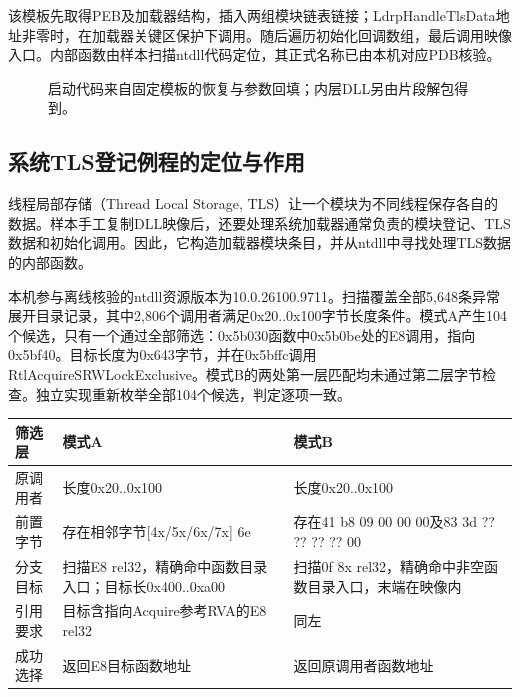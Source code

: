 \documentclass[UTF8,a4paper,zihao=5,fontset=windows]{ctexart}
\newcommand{\code}[1]{{\ttfamily\small #1}}
\newcommand{\fstep}[2]{\textbf{#1}\\[-1pt]{\footnotesize #2}}
\begin{document}
该模板先取得PEB及加载器结构，插入两组模块链表链接；\code{LdrpHandleTlsData}地址非零时，在加载器关键区保护下调用。随后遍历初始化回调数组，最后调用映像入口。内部函数由样本扫描ntdll代码定位，其正式名称已由本机对应PDB核验。

\begin{figure}[H]\centering
{}
\caption{启动代码来自固定模板的恢复与参数回填；内层DLL另由片段解包得到。}
\end{figure}

\subsection{系统TLS登记例程的定位与作用}
线程局部存储（Thread Local Storage, TLS）让一个模块为不同线程保存各自的数据。样本手工复制DLL映像后，还要处理系统加载器通常负责的模块登记、TLS数据和初始化调用。因此，它构造加载器模块条目，并从ntdll中寻找处理TLS数据的内部函数。

本机参与离线核验的ntdll资源版本为\code{10.0.26100.9711}。扫描覆盖全部5,648条异常展开目录记录，其中2,806个调用者满足\code{0x20..0x100}字节长度条件。模式A产生104个候选，只有一个通过全部筛选：\code{0x5b030}函数中\code{0x5b0be}处的\code{E8}调用，指向\code{0x5bf40}。目标长度为\code{0x643}字节，并在\code{0x5bffc}调用\code{RtlAcquireSRWLockExclusive}。模式B的两处第一层匹配均未通过第二层字节检查。独立实现重新枚举全部104个候选，判定逐项一致。

\begin{longtable}{@{}L{24mm}L{66mm}L{60mm}@{}}\toprule 筛选层 & 模式A & 模式B\\\midrule\endhead
原调用者 & 长度\code{0x20..0x100} & 长度\code{0x20..0x100}\\
前置字节 & 存在相邻字节\code{[4x/5x/6x/7x] 6e} & 存在\code{41 b8 09 00 00 00}及\code{83 3d ?? ?? ?? ?? 00}\\
分支目标 & 扫描\code{E8 rel32}，精确命中函数目录入口；目标长\code{0x400..0xa00} & 扫描\code{0f 8x rel32}，精确命中非空函数目录入口，末端在映像内\\
引用要求 & 目标含指向Acquire参考RVA的\code{E8 rel32} & 同左\\
成功选择 & 返回E8目标函数地址 & 返回原调用者函数地址\\\bottomrule\end{longtable}
\end{document}
